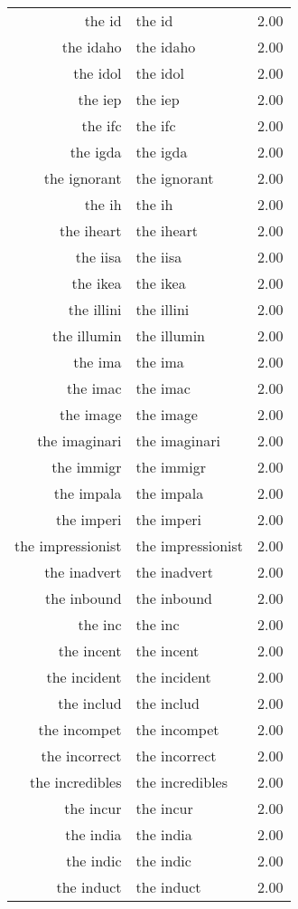 \begin{table}[ht]
\begin{tabular}{rlr}
  the id & the id & 2.00 \\ 
  the idaho & the idaho & 2.00 \\ 
  the idol & the idol & 2.00 \\ 
  the iep & the iep & 2.00 \\ 
  the ifc & the ifc & 2.00 \\ 
  the igda & the igda & 2.00 \\ 
  the ignorant & the ignorant & 2.00 \\ 
  the ih & the ih & 2.00 \\ 
  the iheart & the iheart & 2.00 \\ 
  the iisa & the iisa & 2.00 \\ 
  the ikea & the ikea & 2.00 \\ 
  the illini & the illini & 2.00 \\ 
  the illumin & the illumin & 2.00 \\ 
  the ima & the ima & 2.00 \\ 
  the imac & the imac & 2.00 \\ 
  the image & the image & 2.00 \\ 
  the imaginari & the imaginari & 2.00 \\ 
  the immigr & the immigr & 2.00 \\ 
  the impala & the impala & 2.00 \\ 
  the imperi & the imperi & 2.00 \\ 
  the impressionist & the impressionist & 2.00 \\ 
  the inadvert & the inadvert & 2.00 \\ 
  the inbound & the inbound & 2.00 \\ 
  the inc & the inc & 2.00 \\ 
  the incent & the incent & 2.00 \\ 
  the incident & the incident & 2.00 \\ 
  the includ & the includ & 2.00 \\ 
  the incompet & the incompet & 2.00 \\ 
  the incorrect & the incorrect & 2.00 \\ 
  the incredibles & the incredibles & 2.00 \\ 
  the incur & the incur & 2.00 \\ 
  the india & the india & 2.00 \\ 
  the indic & the indic & 2.00 \\ 
  the induct & the induct & 2.00 \\ 

\end{tabular}
\end{table}
